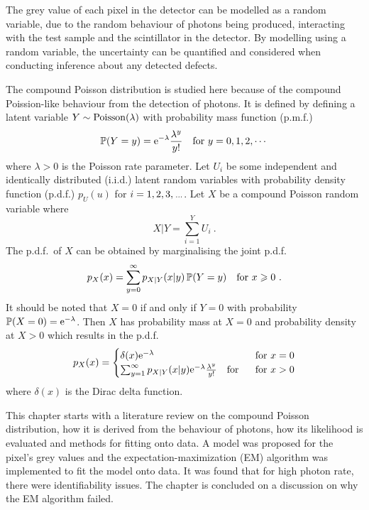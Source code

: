 The grey value of each pixel in the detector can be modelled as a random variable, due to the random behaviour of photons being produced, interacting with the test sample and the scintillator in the detector. By modelling using a random variable, the uncertainty can be quantified and considered when conducting inference about any detected defects.

The compound Poisson distribution is studied here because of the compound Poission-like behaviour from the detection of photons. It is defined by defining a latent variable $Y\sim\operatorname{Poisson}(\lambda)$ with probability mass function (p.m.f.)
\begin{equation}
  \operatorname{\mathbb{P}}(Y=y)=\mathrm{e}^{-\lambda}\frac{\lambda^y}{y!} \quad \text{for }y=0,1,2,\cdots
\end{equation}
where $\lambda>0$ is the Poisson rate parameter. Let $U_i$ be some independent and identically distributed (i.i.d.) latent random variables with probability density function (p.d.f.) $p_U(u)$ for $i=1,2,3,\dotdotdot$. Let $X$ be a compound Poisson random variable where
\begin{equation}
  X|Y = \sum_{i=1}^{Y}U_i \ .
  \label{eq:compoundPoisson_X|Y}
\end{equation}
The p.d.f.~of $X$ can be obtained by marginalising the joint p.d.f.
\begin{equation}
  p_X(x)=\sum_{y=0}^\infty p_{X|Y}(x|y)\operatorname{\mathbb{P}}(Y=y) \quad\text{for }x\geqslant 0
  \ .
\end{equation}
It should be noted that $X=0$ if and only if $Y=0$ with probability $\operatorname{\mathbb{P}}(X=0)=\mathrm{e}^{-\lambda}$. Then $X$ has probability mass at $X=0$ and probability density at $X>0$ which results in the p.d.f.
\begin{equation}
  p_X(x) = 
  \begin{cases}
    \delta(x) \mathrm{e}^{-\lambda}  & \text{ for } x=0 \\ 
    \sum_{y=1}^\infty p_{X|Y}(x|y)\mathrm{e}^{-\lambda}\frac{\lambda^y}{y!} \quad\text{for } & \text{ for } x>0
  \end{cases}
\end{equation}
where $\delta(x)$ is the Dirac delta function.

This chapter starts with a literature review on the compound Poisson distribution, how it is derived from the behaviour of photons, how its likelihood is evaluated and methods for fitting onto data. A model was proposed for the pixel's grey values and the expectation-maximization (EM) algorithm was implemented to fit the model onto data. It was found that for high photon rate, there were identifiability issues. The chapter is concluded on a discussion on why the EM algorithm failed.

